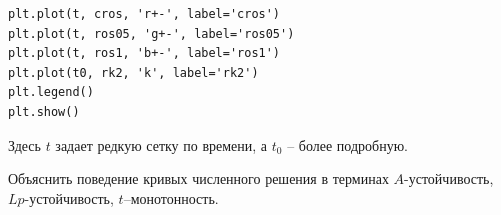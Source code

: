 \documentclass{article}
\begin{document}
\begin{enumerate}
\begin{verbatim}
plt.plot(t, cros, 'r+-', label='cros')
plt.plot(t, ros05, 'g+-', label='ros05')
plt.plot(t, ros1, 'b+-', label='ros1')
plt.plot(t0, rk2, 'k', label='rk2')
plt.legend()
plt.show()
\end{verbatim}
Здесь $t$ задает редкую сетку по времени, а $t_0$ – более подробную. 

Объяснить поведение кривых численного решения в терминах $A$-устойчивость, $Lp$-устойчивость, $t$–монотонность.

\end{enumerate}
\end{document}
